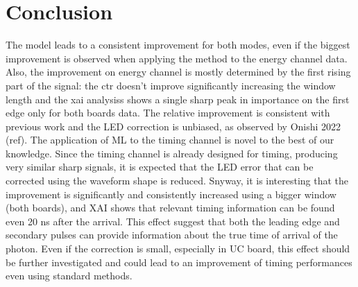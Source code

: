\section{Conclusion}

The model leads to a consistent improvement for both modes, even if the biggest improvement is observed when applying the method
to the energy channel data. Also, the improvement on energy channel is mostly determined by the first rising part of the signal: the ctr
doesn't improve significantly increasing the window length and the xai analysiss shows a single sharp peak in importance on the first edge only
for both boards data. The relative improvement is consistent with previous work and the LED correction is unbiased, as observed by Onishi 2022 (ref). 
The application of ML to the timing channel is novel to the best of our knowledge. Since the timing channel is already designed for timing, producing
very similar sharp signals, it is expected that the LED error that can be corrected using the waveform shape is reduced. Snyway, it is interesting
that the improvement is significantly and consistently increased  using a bigger window (both boards), and XAI shows that relevant timing information can be found
even 20 ns after the arrival. This effect suggest that both the leading edge and secondary pulses can provide information about the true time of 
arrival of the photon. Even if the correction is small, especially in UC board, this effect should be further investigated and could lead to an improvement
of timing performances even using standard methods.
